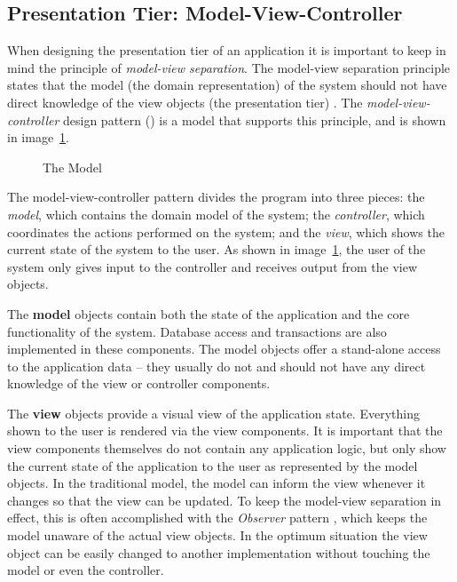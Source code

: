 \subsection{Presentation Tier: Model-View-Controller}
\label{toc:webdevel:threetier:presentation}

When designing the presentation tier of an application it is 
important to keep in mind the principle of \textsl{model-view 
separation}. The model-view separation principle states that the model 
(the domain representation) of the system should not have direct 
knowledge of the view objects (the presentation tier) 
\citep{applying}. The \textsl{model-view-controller} design pattern 
() is a model that supports this principle, and is shown 
in image~\ref{fig:mvcmodel}.

\begin{figure}
\begin{center}
  \caption{The  Model}
  \label{fig:mvcmodel}
\end{center}
\end{figure}

The model-view-controller pattern divides the program into three 
pieces: the \textsl{model}, which contains the domain model of the 
system; the \textsl{controller}, which coordinates the actions 
performed on the system; and the \textsl{view}, which shows the 
current state of the system to the user. As shown in 
image~\ref{fig:mvcmodel}, the user of the system only gives input to 
the controller and receives output from the view objects. 
\citep{legacymvc,mvcpac}

The \textbf{model} objects contain both the state of the application 
and the core functionality of the system. Database access and 
transactions are also implemented in these components. The model 
objects offer a stand-alone access to the application data -- they 
usually do not and should not have any direct knowledge of the view or 
controller components.

The \textbf{view} objects provide a visual view of the application 
state. Everything shown to the user is rendered via the view 
components. It is important that the view components themselves do not 
contain any application logic, but only show the current state of the 
application to the user as represented by the model objects. In the 
traditional  model, the model can inform the view whenever 
it changes so that the view can be updated. To keep the model-view 
separation in effect, this is often accomplished with the 
\textsl{Observer} pattern \citep{applying}, which keeps the model 
unaware of the actual view objects. In the optimum situation the view 
object can be easily changed to another implementation without 
touching the model or even the controller.


